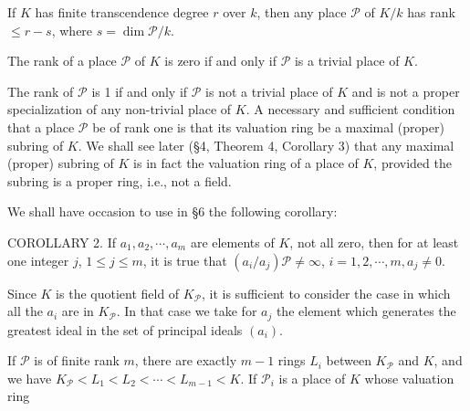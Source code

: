 If $K$ has finite transcendence degree $r$ over $k$, then any place $\mathcal{P}$ of $K/k$ has rank $\leq r-s$, where $s = \dim \mathcal{P}/k$.

The rank of a place $\mathcal{P}$ of $K$ is zero if and only if $\mathcal{P}$ is a trivial place of $K$.

The rank of $\mathcal{P}$ is 1 if and only if $\mathcal{P}$ is not a trivial place of $K$ and is not a proper specialization of any non-trivial place of $K$. A necessary and sufficient condition that a place $\mathcal{P}$ be of rank one is that its valuation ring be a maximal (proper) subring of $K$. We shall see later (§4, Theorem 4, Corollary 3) that any maximal (proper) subring of $K$ is in fact the valuation ring of a place of $K$, provided the subring is a proper ring, i.e., not a field.

We shall have occasion to use in §6 the following corollary:

COROLLARY 2. If $a_1, a_2, \cdots, a_m$ are elements of $K$, not all zero, then for at least one integer $j$, $1 \leq j \leq m$, it is true that $(a_i/a_j)\mathcal{P} \neq \infty$, $i=1, 2, \cdots, m, a_j \neq 0$.

Since $K$ is the quotient field of $K_\mathcal{P}$, it is sufficient to consider the case in which all the $a_i$ are in $K_\mathcal{P}$. In that case we take for $a_j$ the element which generates the greatest ideal in the set of principal ideals $(a_i)$.

If $\mathcal{P}$ is of finite rank $m$, there are exactly $m-1$ rings $L_i$ between $K_\mathcal{P}$ and $K$, and we have $K_\mathcal{P} < L_1 < L_2 < \cdots < L_{m-1} < K$. If $\mathcal{P}_i$ is a place of $K$ whose valuation ring